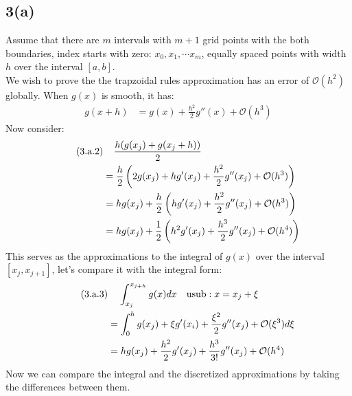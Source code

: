 \documentclass[]{article}
\begin{document}
    \subsection*{3(a)}
        Assume that there are $m$ intervals with $m + 1$ grid points with the both boundaries, index starts with zero: $x_0, x_1, \cdots x_m$, equally spaced points with width $h$ over the interval $[a, b]$. 
        \\
        We wish to prove the the trapzoidal rules approximation has an error of $\mathcal{O}(h^2)$ globally. When $g(x)$ is smooth, it has: 
        \begin{align*}\tag{3.a.1}\label{eqn:3.a.1}
            g(x + h) &= g(x) + \frac{h^2}{2}g''(x) + \mathcal{O}(h^3)
        \end{align*}
        Now consider: 
        \begin{align*}\tag{3.a.2}\label{eqn:3.a.2}
            &\hspace{1.1em} 
            \frac{h(g(x_j) + g(x_j + h))}{2}\\
            &= 
            \frac{h}{2}\left(
                2g(x_j) + hg'(x_j) + \frac{h^2}{2}g''(x_j)
                + \mathcal{O}(h^3) 
            \right)
            \\
            &= 
            hg(x_j) + \frac{h}{2}\left(
                hg'(x_j) + \frac{h^2}{2}g''(x_j) + \mathcal{O}(h^3)
            \right)
            \\
            &= 
            hg(x_j) +  \frac{1}{2}\left(
                h^2g'(x_j) + \frac{h^3}{2}g''(x_j) + \mathcal{O}(h^4)
            \right)
        \end{align*}
        This serves as the approximations to the integral of $g(x)$ over the interval $[x_j, x_{j + 1}]$, let's compare it with the integral form: 
        \begin{align*}\tag{3.a.3}\label{eqn:3.a.3}
            & \hspace{1.1em}
            \int_{x_j}^{x_{j + h}} g(x)dx \quad \text{usub}: x = x_j+ \xi\\ 
            &= \int_{0}^{h} 
                g(x_j) + \xi g'(x_i) + \frac{\xi^2}{2}g''(x_j) + 
                \mathcal{O}(\xi^3)
            d\xi
            \\
            &= hg(x_j) + \frac{h^2}{2}g'(x_j) + \frac{h^3}{3!}g''(x_j) + \mathcal{O}(h^4)
        \end{align*}
        Now we can compare the integral and the discretized approximations by taking the differences between them. 
\end{document}
